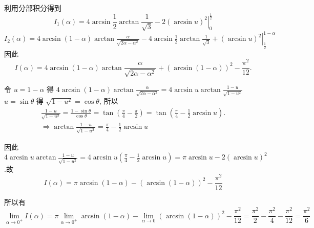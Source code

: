 \begin{solution}
    利用分部积分得到
    $$
        I_1(\alpha)=4 \arcsin \frac{1}{2} \arctan \frac{1}{\sqrt{3}}-\left.2(\arcsin u)^2\right|_0 ^{\frac{1}{2}}
    $$
    $I_2(\alpha)=4 \arcsin (1-\alpha) \arctan \frac{\alpha}{\sqrt{2 \alpha-\alpha^2}}-4 \arcsin \frac{1}{2} \arctan \frac{1}{\sqrt{3}}+\left.(\arcsin u)^2\right|_{\frac{1}{2}} ^{1-\alpha}$因此
    $$
        I(\alpha)=4 \arcsin (1-\alpha) \arctan \frac{\alpha}{\sqrt{2 \alpha-\alpha^2}}+(\arcsin (1-\alpha))^2-\frac{\pi^2}{12} .
    $$

    令 $u=1-\alpha$ 得
    $4 \arcsin (1-\alpha) \arctan \frac{\alpha}{\sqrt{2 \alpha-\alpha^2}}=4 \arcsin u \arctan \frac{1-u}{\sqrt{1-u^2}}$
    $u=\sin \theta$ 得 $\sqrt{1-u^2}=\cos \theta$, 所以
    $$
        \begin{gathered}
            \frac{1-u}{\sqrt{1-u^2}}=\frac{1-\sin \theta}{\cos \theta}=\tan \left(\frac{\pi}{4}-\frac{\pi}{2}\right)=\tan \left(\frac{\pi}{4}-\frac{1}{2} \arcsin u\right) . \\
            \Rightarrow \arctan \frac{1-u}{\sqrt{1-u^2}}=\frac{\pi}{4}-\frac{1}{2} \arcsin u
        \end{gathered}
    $$

    因此
    $4 \arcsin u \arctan \frac{1-u}{\sqrt{1-u^2}}=4 \arcsin u\left(\frac{\pi}{4}-\frac{1}{2} \arcsin u\right)=\pi \arcsin u-2(\arcsin u)^2$.故
    $$
        I(\alpha)=\pi \arcsin (1-\alpha)-(\arcsin (1-\alpha))^2-\frac{\pi^2}{12}
    $$

    所以有
    $$
        \lim _{\alpha \rightarrow 0^{+}} I(\alpha)=\pi \lim _{\alpha \rightarrow 0^{+}} \arcsin (1-\alpha)-\lim _{\alpha \rightarrow 0}(\arcsin (1-\alpha))^2-\frac{\pi^2}{12}=\frac{\pi^2}{2}-\frac{\pi^2}{4}-\frac{\pi^2}{12}=\frac{\pi^2}{6}
    $$
\end{solution}

% 





